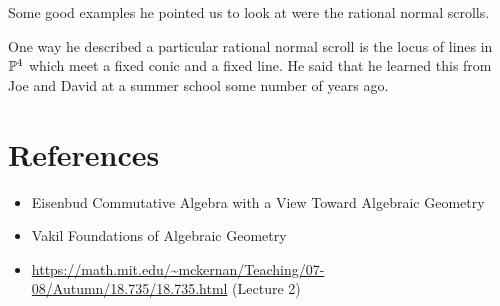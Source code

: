 \documentclass[12pt]{article}
\begin{document}
 Some good examples he pointed us to look at were the rational normal scrolls.

\hfill

One way he described a particular rational normal scroll is the locus of lines in $\P^4$ which meet a fixed conic and a fixed line. He said that he learned this from Joe and David at a summer school some number
of years ago.

\section{References}
\begin{itemize}
    \item Eisenbud Commutative Algebra with a View Toward Algebraic Geometry
    \item Vakil Foundations of Algebraic Geometry
    \item \url{https://math.mit.edu/~mckernan/Teaching/07-08/Autumn/18.735/18.735.html} (Lecture 2)
    
\end{itemize}
\end{document}
